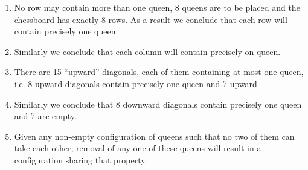 \documentclass[twoside,11pt]{book}
\begin{document}
\begin{enumerate}[wide, nosep, label=(\alph*)]
	\item \label{en:property-a}
	No row may contain more than one queen, 8 queens are to be placed and the chessboard has exactly 8 rows. As a result we conclude that each row will contain precisely one queen.
	\item Similarly we conclude that each column will contain precisely on queen.
	\item There are 15 ``upward'' diagonals, each of them containing at most one queen, i.e. 8 upward diagonals contain precisely one queen and 7 upward
	\item Similarly we conclude that 8 downward diagonals contain precisely one queen and 7 are empty.
	\item Given any non-empty configuration of queens such that no two of them can take each other, removal of any one of these queens will result in a configuration sharing that property.
\end{enumerate}
\end{document}
